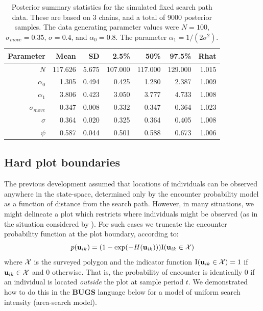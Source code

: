 \begin{table}[ht]
\caption{Posterior summary statistics for the simulated fixed search
  path data. 
These are based on 3 chains,
and a total of 9000 posterior samples.  The data generating parameter values
were $N=100$, $\sigma_{move} = 0.35$, $\sigma = 0.4$, and $\alpha_{0}
= 0.8$. The parameter $\alpha_{1} = 1/(2\sigma^{2})$.
}
\begin{tabular}{rrrrrrr} \hline \hline
 Parameter               & Mean     & SD     & 2.5\%    & 50\%     & 97.5\%   & Rhat   \\ \hline
$N$             & 117.626  & 5.675  & 107.000  & 117.000  & 129.000  & 1.015   \\
$\alpha_0$      & 1.305    & 0.494  & 0.425    & 1.280    & 2.387    & 1.009   \\
$\alpha_1$      & 3.806    & 0.423  & 3.050    & 3.777    & 4.733    & 1.008   \\
$\sigma_{move}$  & 0.347    & 0.008  & 0.332    & 0.347    & 0.364    & 1.023   \\
$\sigma$       & 0.364  &  0.020 &  0.325     &  0.364   & 0.405    & 1.008  \\
$\psi$         & 0.587    & 0.044  & 0.501    & 0.588    & 0.673    & 1.006    \\
\hline
\end{tabular}
\label{searchencounter.tab.simtable}
\end{table}


\subsection{Hard plot boundaries}

The previous development assumed that locations of individuals can be
observed anywhere in the state-space, determined only by the encounter
probability model as a function of distance from the search path.
However, in many situations, we might delineate a plot which restricts
where individuals might be observed (as in the situation considered by
\citet{royle_young:2008}).  For such cases we truncate the encounter
probability function at the plot boundary, according to:
\begin{equation}
p({\bf u}_{ik}) = (1- \exp(-H({\bf u}_{ik}))) \mbox{I}({\bf u}_{ik} \in {\cal X})
\label{search-encounter.eq.hardplot}
\end{equation}
where ${\cal X}$ is the surveyed polygon and the indicator function
$\mbox{I}({\bf u}_{ik} \in {\cal X}) = 1$ if ${\bf u}_{ik} \in {\cal
  X}$ and 0 otherwise.  That is, the probability of encounter is
identically 0 if an individual is located {\it outside} the plot at
sample period $t$.  We demonstrated how to do this in the {\bf BUGS}
language below for a model of uniform search intensity (area-search
model).



